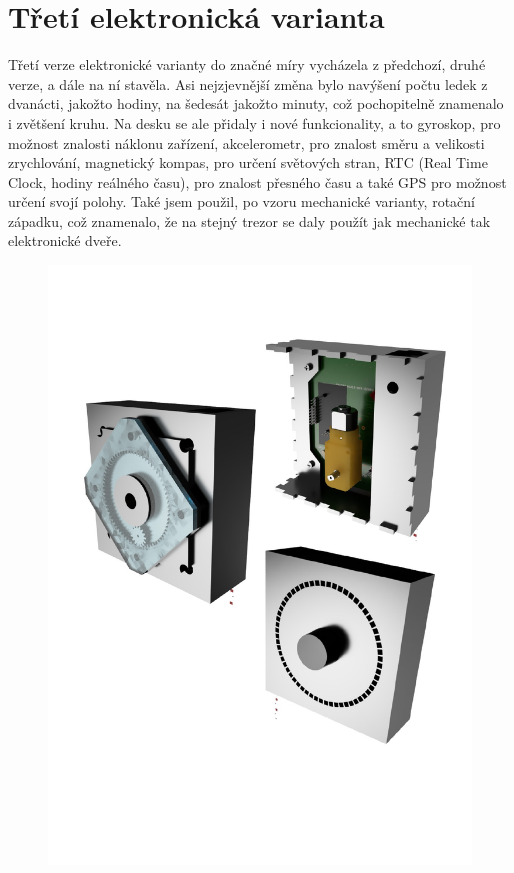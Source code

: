 \section*{Třetí elektronická varianta}

Třetí verze elektronické varianty do značné míry vycházela z předchozí, druhé verze, a dále na ní stavěla. Asi nejzjevnější změna bylo navýšení počtu 
ledek z dvanácti, jakožto hodiny, na šedesát jakožto minuty, což pochopitelně znamenalo i zvětšení kruhu. Na desku se ale přidaly i nové funkcionality,
a to gyroskop, pro možnost znalosti náklonu zařízení, akcelerometr, pro znalost směru a velikosti zrychlování, magnetický kompas, pro určení světových
stran, RTC (Real Time Clock, hodiny reálného času), pro znalost přesného času a také GPS pro možnost určení svojí polohy.
Také jsem použil, po vzoru mechanické varianty, rotační západku, což znamenalo, že na stejný trezor se daly použít jak mechanické tak 
elektronické dveře.

\begin{figure}[htbp]
    \centering
    \includegraphics[width=\textwidth]{kapitoly/obrazky/E3.0-render0.pdf}
    \label{fig:M1}
\end{figure}


